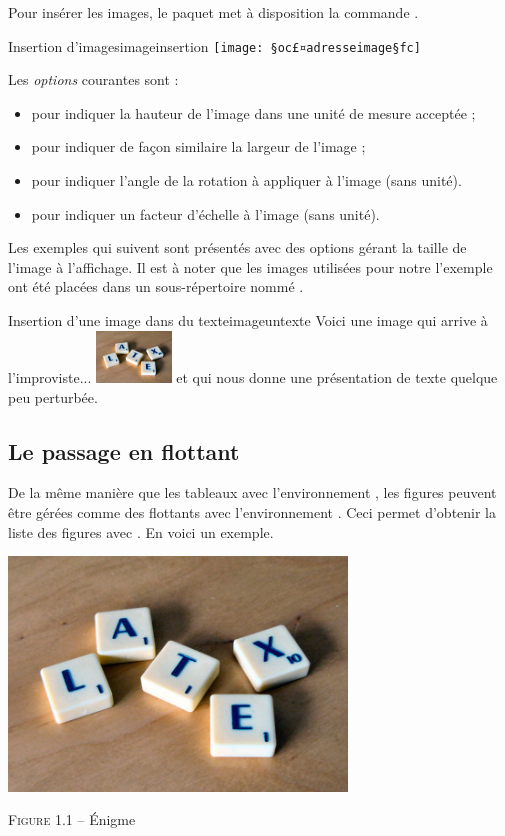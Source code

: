 Pour insérer les images, le paquet  met à disposition la commande . 

\begin{codesimple}{Insertion d'images}{imageinsertion}
\texttt{[image: §oc£¤adresseimage§fc]}
\end{codesimple}

Les \emph{options} courantes sont :
\begin{itemize}
\item {} pour indiquer la hauteur de l'image dans une unité de mesure acceptée ;
\item {} pour indiquer de façon similaire la largeur de l'image ;
\item {} pour indiquer l'angle de la rotation à appliquer à l'image (sans unité).
\item {} pour indiquer un facteur d'échelle à l'image (sans unité).
\end{itemize}
Les exemples qui suivent sont présentés avec des options gérant la taille de l'image à l'affichage. Il est à noter que les images utilisées pour notre l'exemple ont été placées dans un sous-répertoire nommé . 

\begin{codedouble}{Insertion d'une image dans du texte}{imageuntexte}
Voici une image qui arrive à l'improviste...
\includegraphics[width=2cm]{images/lettres.jpg}
et qui nous donne une présentation de texte quelque peu perturbée. 
\end{codedouble}

\subsection{Le passage en flottant}

De la même manière que les tableaux avec l'environnement , les figures peuvent être gérées comme des flottants avec l'environnement . Ceci permet d'obtenir la liste des figures avec . En voici un exemple.

\begin{codedoublevrai}
\centering 
\includegraphics[width=9cm]{images/lettres.jpg} 
\par\vspace{0.8\baselineskip} \textsc{Figure 1.1} -- \'{E}nigme
\end{codedoublevrai}

